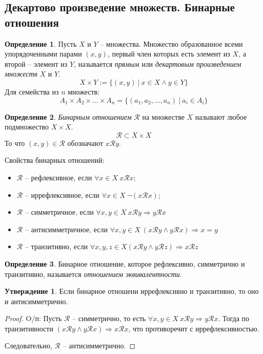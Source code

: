 \documentclass[14pt, a4paper]{article}
\theoremstyle{definition}
\newtheorem{definition}{Определение}[section]
\newtheorem*{statement}{Утверждение}
\theoremstyle{remark}
\begin{document}
\subsection{Декартово произведение множеств. Бинарные отношения}
\begin{definition}
Пусть $X$ и $Y$ -- множества. Множество образованное всеми упорядоченными парами $(x,y)$, первый член которых есть элемент из $X$, а второй -- элемент из $Y$, называется \textit{прямым} или \textit{декартовым произведением множеств} $X$ и $Y$.
$$X \times Y := \{(x, y) \ \vert \ x \in X \wedge y \in Y\}$$
Для семейства из $n$ множеств:
$$A_1 \times A_2 \times ... \times A_n = \{(a_1, a_2, ..., a_n) \ \vert \ a_i \in A_i\}$$
\end{definition}
\begin{definition}
\textit{Бинарным отношением} $\mathcal{R}$ на множестве $X$ называют любое подмножество $X \times X$.
$$\mathcal{R} \subset X \times X$$
То что $(x, y) \in \mathcal{R}$ обозначают $x \mathcal{R} y$.
\end{definition}
Свойства бинарных отношений:
\begin{itemize}
\item[1.] $\mathcal{R}$ -- рефлексивное, если $\forall x \in X \ x \mathcal{R} x$;
\item[1'.] $\mathcal{R}$ -- иррефлексивное, если $\forall x \in X \ \neg (x \mathcal{R} x)$;
\item[2.] $\mathcal{R}$ -- симметричное, если $\forall x,y \in X \ x \mathcal{R} y \Rightarrow y \mathcal{R} x$
\item[2'.] $\mathcal{R}$ -- антисимметричное, если $\forall x,y \in X \ (x \mathcal{R} y \wedge y \mathcal{R} x) \Rightarrow x = y$
\item[3.] $\mathcal{R}$ -- транзитивно, если $\forall x, y, z \in X (x \mathcal{R} y \wedge y \mathcal{R} z) \Rightarrow x \mathcal{R} z$
\end{itemize}
\begin{definition}
Бинарное отношение, которое рефлексивно, симметрично и транзитивно, называется \textit{отношением эквивалентности}.
\end{definition}
\begin{statement}
Если бинарное отношени иррефлексивно и транзитивно, то оно и антисимметрично.
\end{statement}
\begin{proof}
O/п: Пусть $\mathcal{R}$ -- симметрично, то есть $\forall x,y \in X \ x \mathcal{R} y \Rightarrow y \mathcal{R} x$. Тогда по транзитивности
$(x \mathcal{R} y \wedge y \mathcal{R} x) \Rightarrow x \mathcal{R} x$, что противоречит с иррефлексивностью.

Следовательно, $\mathcal{R}$ -- антисимметрично.
\end{proof}
\end{document}

